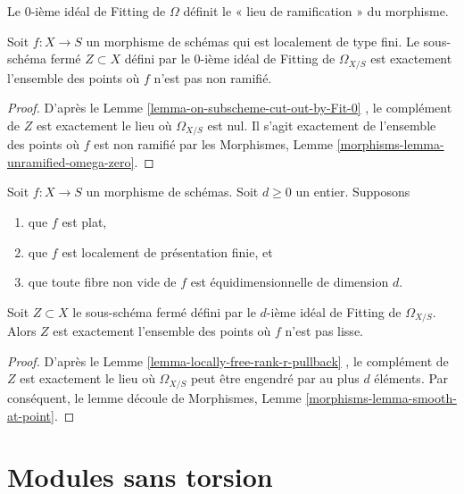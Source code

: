 \noindent
Le  $0$-ième idéal de Fitting de  $\Omega$  définit le « lieu de
ramification » du morphisme.

\begin{lemma}
\label{lemma-zero-fitting-ideal-omega-unramified}
Soit  $f : X \to S$  un morphisme de schémas qui est localement de type fini. Le
sous-schéma fermé  $Z \subset X$  défini par le  $0$-ième idéal de Fitting de
 $\Omega_{X/S}$  est exactement l'ensemble des points où  $f$  n'est pas non ramifié.
\end{lemma}

\begin{proof}
D'après le Lemme  \ref{lemma-on-subscheme-cut-out-by-Fit-0} , le complément de  $Z$  est exactement le
lieu où  $\Omega_{X/S}$  est nul. Il s'agit exactement de l'ensemble des points où
 $f$  est non ramifié par les Morphismes, Lemme  \ref{morphisms-lemma-unramified-omega-zero}.
\end{proof}

\begin{lemma}
\label{lemma-d-fitting-ideal-omega-smooth}
Soit  $f : X \to S$  un morphisme de schémas. Soit  $d \geq 0$  un entier. Supposons
\begin{enumerate}
\item que $f$  est plat,
\item que $f$  est localement de présentation finie, et
\item que toute fibre non vide de  $f$  est équidimensionnelle de dimension
 $d$.
\end{enumerate}
Soit  $Z \subset X$  le sous-schéma fermé défini par le $d$-ième idéal de Fitting
de  $\Omega_{X/S}$. Alors  $Z$  est exactement l'ensemble des
points où  $f$  n'est pas lisse.
\end{lemma}

\begin{proof}
D'après le Lemme  \ref{lemma-locally-free-rank-r-pullback} , le complément de  $Z$  est exactement le
lieu où  $\Omega_{X/S}$  peut être engendré par au plus  $d$  éléments. Par
conséquent, le lemme découle de Morphismes, Lemme  \ref{morphisms-lemma-smooth-at-point}.
\end{proof}







\section{Modules sans torsion}
\label{section-torsion-free}

